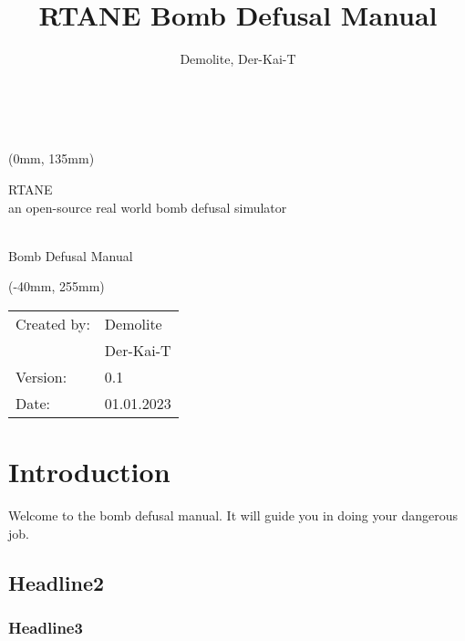 \documentclass[11pt]{scrartcl}
\title{RTANE Bomb Defusal Manual}
\author{Demolite, Der-Kai-T}
\begin{document}
\begin{titlepage}




\centering


\ \\



\begin{textblock*}{210mm}(0mm, 135mm)

{\fontsize{18}{16} \selectfont RTANE } \\
{\fontsize{20}{18} \selectfont an open-source real world bomb defusal simulator }

\ \\

{\fontsize{28}{40} \selectfont Bomb Defusal Manual}
\ \\




\end{textblock*}


\begin{textblock*}{180mm}(-40mm, 255mm)
\begin{tabular}{ll}
Created by: & Demolite \\
 & Der-Kai-T\\
 
 Version: & 0.1 \\
 Date: & 01.01.2023 \\

\end{tabular}

\end{textblock*}


\end{titlepage}




\pagebreak
\tableofcontents
\pagebreak

\section{Introduction}
Welcome to the bomb defusal manual. It will guide you in doing your dangerous job.


\subsection{Headline2}

\subsubsection{Headline3}



\end{document}
